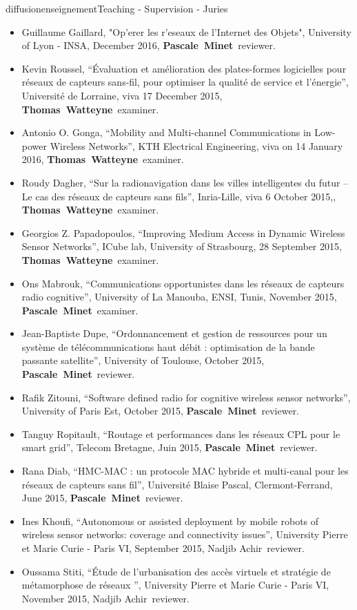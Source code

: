 \documentclass{ra2016}
\newcommand{\pascale} {\textbf{Pascale~Minet}}
\newcommand{\thomas}  {\textbf{Thomas~Watteyne}}
\begin{document}
\begin{module}{diffusion}{enseignement}{Teaching - Supervision - Juries}
\begin{itemize}
\begin{itemize}
          	\item Guillaume Gaillard, "Op'erer les r'eseaux de l'Internet des Objets", University of Lyon - INSA, December 2016, \pascale~reviewer. 
            \item Kevin Roussel, ``\'Evaluation et am\'elioration des plates-formes logicielles pour r\'eseaux de capteurs sans-fil, pour optimiser la qualit\'e de service et l'\'energie'', Universit\'e de Lorraine, viva 17 December 2015, \thomas~examiner.
            \item Antonio O. Gonga, ``Mobility and Multi-channel Communications in Low-power Wireless Networks'', KTH Electrical Engineering, viva on 14 January 2016, \thomas~examiner.
            \item Roudy Dagher, ``Sur la radionavigation dans les villes intelligentes du futur – Le cas des r\'eseaux de capteurs sans fils'', Inria-Lille, viva  6 October 2015,, \thomas~examiner.
            \item Georgios Z. Papadopoulos, ``Improving Medium Access in Dynamic Wireless Sensor Networks'', ICube lab, University of Strasbourg, 28 September 2015, \thomas~examiner.
            \item Ons Mabrouk, ``Communications opportunistes dans les r\'eseaux de capteurs radio cognitive'', University of La Manouba, ENSI, Tunis, November 2015, \pascale~examiner.
            \item Jean-Baptiste Dupe, ``Ordonnancement et gestion de ressources pour un syst\`eme de t\'el\'ecommunications haut d\'ebit : optimisation de la bande passante satellite'', University of Toulouse, October 2015, \pascale~reviewer.
            \item Rafik Zitouni, ``Software defined radio for cognitive wireless sensor networks'', University of Paris Est, October 2015, \pascale~reviewer.
            \item Tanguy Ropitault, ``Routage et performances dans les r\'eseaux CPL pour le smart grid'', Telecom Bretagne, Juin 2015, \pascale~reviewer.
            \item Rana Diab, ``HMC-MAC : un protocole MAC hybride et multi-canal pour les r\'eseaux de capteurs sans fil'', Universit\'e Blaise Pascal,  Clermont-Ferrand, June 2015, \pascale~reviewer.      
            \item  Ines Khoufi, ``Autonomous or assisted deployment by mobile robots of wireless sensor networks: coverage and connectivity issues'', University Pierre et Marie Curie - Paris VI, September 2015, Nadjib Achir~reviewer. 
            \item  Oussama Stiti, ``Étude de l'urbanisation des accès virtuels et stratégie de métamorphose de réseaux '', University Pierre et Marie Curie - Paris VI, November 2015, Nadjib Achir~reviewer. 

\end{itemize}
\end{itemize}
\end{module}
\end{document}
